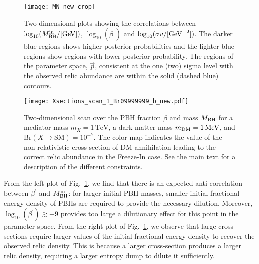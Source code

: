 \documentclass[aps,prd,reprint,twocolumn,preprintnumbers,floatfix,nofootinbib]{revtex4-1}
\newcommand{\MBH}{M_{\rm BH}}
\newcommand{\figref}[1]{Fig.~\ref{#1}}
\begin{document}
\begin{figure}[t!]
\centering
 \texttt{[image: MN\_new-crop]}
 \caption{\label{fig:FI_dilute3} Two-dimensional plots showing the 
 correlations between $\log_{10}(\MBH^{\rm in}/[\rm{GeV}])$, $\log_{10}(\beta^\prime)$ and $\log_{10}(\sigma v/[\rm{GeV}^{-2}])$. 
{The darker blue regions shows  higher posterior probabilities and the lighter blue regions show regions with lower posterior probability. The regions of the parameter space, $\vec{p}$, consistent at the one (two) sigma level with the observed relic abundance are within the solid (dashed blue) contours.}
 }
\end{figure}

\begin{figure*}
    \centering
    \texttt{[image: Xsections\_scan\_1\_Br09999999\_b\_new.pdf]}
    \caption{\label{fig:scan_FI}\footnotesize Two-dimensional scan over the PBH fraction $\beta$ and mass $\MBH$ for a mediator mass $m_X=1\,\mathrm{TeV}$, a dark matter mass $m_{\rm DM}=1\,\mathrm{MeV}$, and $\mathrm{Br}(X\to \mathrm{SM})=10^{-7}$. The color map indicates the value of the non-relativistic cross-section of DM annihilation leading to the correct relic abundance in the Freeze-In case. See the main text for a description of the different constraints.}
\end{figure*}
From the left plot of \figref{fig:FI_dilute3}, we find that there is an expected anti-correlation between $\beta^{\prime} $ and $\MBH^{\rm in}$: for larger initial PBH masses, smaller initial fractional energy density of PBHs are required to provide the necessary dilution. Moreover, $\log_{10}(\beta^\prime) \gtrsim -9$ provides too large a dilutionary effect for this point in the parameter space.  From the right plot of \figref{fig:FI_dilute3}, we observe that large cross-sections require larger values of the initial fractional energy density to recover the observed relic density. This is because a larger cross-section produces a larger relic density, requiring a larger entropy dump to dilute it sufficiently. 
\end{document}
